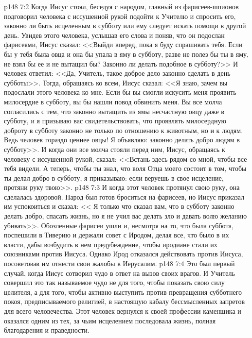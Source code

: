 \vs p148 7:2 Когда Иисус стоял, беседуя с народом, главный из фарисеев\hyp{}шпионов подговорил человека с иссушенной рукой подойти к Учителю и спросить его, законно ли быть исцеленным в субботу или ему следует искать помощи в другой день. Увидев этого человека, услышав его слова и поняв, что он подослан фарисеями, Иисус сказал: <<Выйди вперед, пока я буду спрашивать тебя. Если бы у тебя была овца и она бы упала в яму в субботу, разве не полез бы ты в яму, не взял бы ее и не вытащил бы? Законно ли делать подобное в субботу?>> И человек ответил: <<Да, Учитель, такое доброе дело законно сделать в день субботы>>. Тогда, обращаясь ко всем, Иисус сказал: <<Я знаю, зачем вы подослали этого человека ко мне. Если бы вы смогли искусить меня проявить милосердие в субботу, вы бы нашли повод обвинить меня. Вы все молча согласились с тем, что законно вытащить из ямы несчастную овцу даже в субботу, и я призываю вас свидетельствовать, что проявлять милосердную доброту в субботу законно не только по отношению к животным, но и к людям. Ведь человек гораздо ценнее овцы! Я объявляю: законно делать добро людям в субботу>>. И когда они все молча стояли перед ним, Иисус, обращаясь к человеку с иссушенной рукой, сказал: <<Встань здесь рядом со мной, чтобы все тебя видели. А теперь, чтобы ты знал, что воля Отца моего состоит в том, чтобы ты делал добро в субботу, я приказываю: если веруешь в свое исцеление, протяни руку твою>>.
\vs p148 7:3 И когда этот человек протянул свою руку, она сделалась здоровой. Народ был готов броситься на фарисеев, но Иисус приказал им успокоиться и сказал: << Я только что сказал вам, что в субботу законно делать добро, спасать жизнь, но я не учил вас делать зло и давать волю желанию убивать>>. Обозленные фарисеи ушли и, несмотря на то, что была суббота, поспешили в Тиверию и держали совет с Иродом, делая все, что было в их власти, дабы возбудить в нем предубеждение, чтобы иродиане стали их союзниками против Иисуса. Однако Ирод отказался действовать против Иисуса, посоветовав им отнести свои жалобы в Иерусалим.
\vs p148 7:4 Это был первый случай, когда Иисус сотворил чудо в ответ на вызов своих врагов. И Учитель совершил это так называемое чудо не для того, чтобы показать свою силу целителя, а для того, чтобы активно выступить против превращения субботнего покоя, предписываемого религией, в настоящую кабалу бессмысленных запретов для всего человечества. Этот человек вернулся к своей профессии каменщика и оказался одним из тех, за чьим исцелением последовала жизнь, полная благодарения и праведности.
